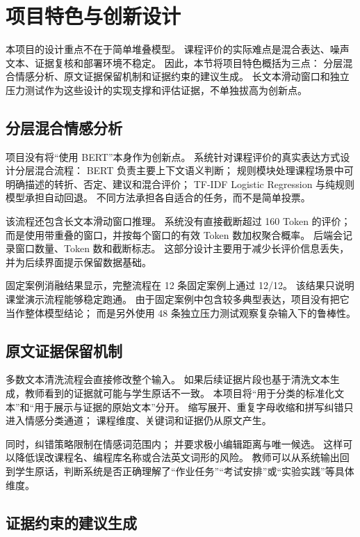 \section{项目特色与创新设计}

本项目的设计重点不在于简单堆叠模型。
课程评价的实际难点是混合表达、噪声文本、证据复核和部署环境不稳定。
因此，本节将项目特色概括为三点：
分层混合情感分析、原文证据保留机制和证据约束的建议生成。
长文本滑动窗口和独立压力测试作为这些设计的实现支撑和评估证据，不单独拔高为创新点。

\subsection{分层混合情感分析}

项目没有将“使用 BERT”本身作为创新点。
系统针对课程评价的真实表达方式设计分层混合流程：
BERT 负责主要上下文语义判断；
规则模块处理课程场景中可明确描述的转折、否定、建议和混合评价；
TF-IDF Logistic Regression 与纯规则模型承担自动回退。
不同方法承担各自适合的任务，而不是简单投票。

该流程还包含长文本滑动窗口推理。
系统没有直接截断超过 160 Token 的评价；
而是使用带重叠的窗口，并按每个窗口的有效 Token 数加权聚合概率。
后端会记录窗口数量、Token 数和截断标志。
这部分设计主要用于减少长评价信息丢失，并为后续界面提示保留数据基础。

固定案例消融结果显示，完整流程在 12 条固定案例上通过 12/12。
该结果只说明课堂演示流程能够稳定跑通。
由于固定案例中包含较多典型表达，项目没有把它当作整体模型结论；
而是另外使用 48 条独立压力测试观察复杂输入下的鲁棒性。

\subsection{原文证据保留机制}

多数文本清洗流程会直接修改整个输入。
如果后续证据片段也基于清洗文本生成，教师看到的证据就可能与学生原话不一致。
本项目将“用于分类的标准化文本”和“用于展示与证据的原始文本”分开。
缩写展开、重复字母收缩和拼写纠错只进入情感分类通道；
课程维度、关键词和证据仍从原文产生。

同时，纠错策略限制在情感词范围内；
并要求极小编辑距离与唯一候选。
这样可以降低误改课程名、编程库名称或合法英文词形的风险。
教师可以从系统输出回到学生原话，判断系统是否正确理解了“作业任务”“考试安排”或“实验实践”等具体维度。

\subsection{证据约束的建议生成}

